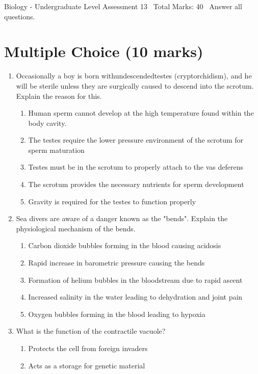 \documentclass[12pt]{article}
\begin{document}
\begin{center}
Biology - Undergraduate Level Assessment 13 \
Total Marks: 40 \
Answer all questions.
\end{center}

\section*{Multiple Choice (10 marks)}
\begin{enumerate}[label=\arabic*.]
\item Occasionally a boy is born withundescendedtestes (cryptorchidism), and he will be sterile unless they are surgically caused to descend into the scrotum. Explain the reason for this.
\begin{enumerate}[label=(\alph*)]
    \item Human sperm cannot develop at the high temperature found within the body cavity.
    \item The testes require the lower pressure environment of the scrotum for sperm maturation
    \item Testes must be in the scrotum to properly attach to the vas deferens
    \item The scrotum provides the necessary nutrients for sperm development
    \item Gravity is required for the testes to function properly
\end{enumerate}
\item Sea divers are aware of a danger known as the "bends". Explain the physiological mechanism of the bends.
\begin{enumerate}[label=(\alph*)]
    \item Carbon dioxide bubbles forming in the blood causing acidosis
    \item Rapid increase in barometric pressure causing the bends
    \item Formation of helium bubbles in the bloodstream due to rapid ascent
    \item Increased salinity in the water leading to dehydration and joint pain
    \item Oxygen bubbles forming in the blood leading to hypoxia
\end{enumerate}
\item What is the function of the contractile vacuole?
\begin{enumerate}[label=(\alph*)]
    \item Protects the cell from foreign invaders
    \item Acts as a storage for genetic material

\end{enumerate}
\end{enumerate}
\end{document}
